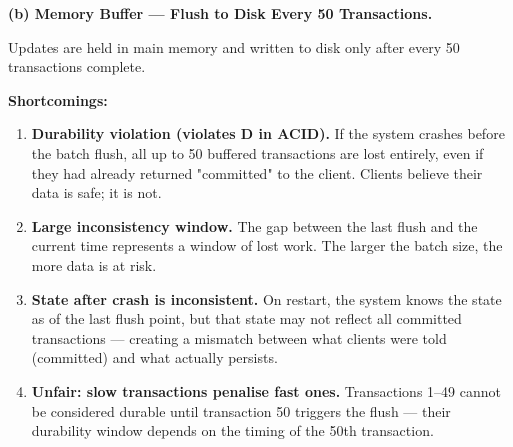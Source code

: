 \documentclass[12pt,a4paper]{article}
\begin{document}
\begin{solbox}
\textbf{(b) Memory Buffer — Flush to Disk Every 50 Transactions.}

Updates are held in main memory and written to disk only after every 50 transactions complete.

\textbf{Shortcomings:}
\begin{enumerate}
  \item \textbf{Durability violation (violates D in ACID).}
        If the system crashes before the batch flush, all up to 50 buffered transactions
        are lost entirely, even if they had already returned "committed" to the client.
        Clients believe their data is safe; it is not.

  \item \textbf{Large inconsistency window.}
        The gap between the last flush and the current time represents a window of lost
        work. The larger the batch size, the more data is at risk.

  \item \textbf{State after crash is inconsistent.}
        On restart, the system knows the state as of the last flush point, but that state
        may not reflect all committed transactions — creating a mismatch between what
        clients were told (committed) and what actually persists.

  \item \textbf{Unfair: slow transactions penalise fast ones.}
        Transactions 1–49 cannot be considered durable until transaction 50 triggers the
        flush — their durability window depends on the timing of the 50th transaction.
\end{enumerate}
\end{solbox}
\end{document}
